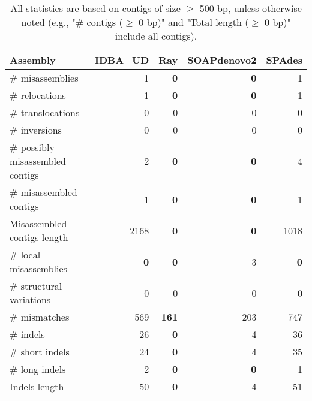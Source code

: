 \documentclass[12pt,a4paper]{article}
\begin{document}
\begin{table}[ht]
\begin{center}
\caption{All statistics are based on contigs of size $\geq$ 500 bp, unless otherwise noted (e.g., "\# contigs ($\geq$ 0 bp)" and "Total length ($\geq$ 0 bp)" include all contigs).}
\begin{tabular}{|l*{4}{|r}|}
\hline
Assembly & IDBA\_UD & Ray & SOAPdenovo2 & SPAdes \\ \hline
\# misassemblies & 1 & {\bf 0} & {\bf 0} & 1 \\ \hline
\hspace{5mm}\# relocations & 1 & {\bf 0} & {\bf 0} & 1 \\ \hline
\hspace{5mm}\# translocations & 0 & 0 & 0 & 0 \\ \hline
\hspace{5mm}\# inversions & 0 & 0 & 0 & 0 \\ \hline
\# possibly misassembled contigs & 2 & {\bf 0} & {\bf 0} & 4 \\ \hline
\# misassembled contigs & 1 & {\bf 0} & {\bf 0} & 1 \\ \hline
Misassembled contigs length & 2168 & {\bf 0} & {\bf 0} & 1018 \\ \hline
\# local misassemblies & {\bf 0} & {\bf 0} & 3 & {\bf 0} \\ \hline
\# structural variations & 0 & 0 & 0 & 0 \\ \hline
\# mismatches & 569 & {\bf 161} & 203 & 747 \\ \hline
\# indels & 26 & {\bf 0} & 4 & 36 \\ \hline
\hspace{5mm}\# short indels & 24 & {\bf 0} & 4 & 35 \\ \hline
\hspace{5mm}\# long indels & 2 & {\bf 0} & {\bf 0} & 1 \\ \hline
Indels length & 50 & {\bf 0} & 4 & 51 \\ \hline
\end{tabular}
\end{center}
\end{table}
\end{document}
